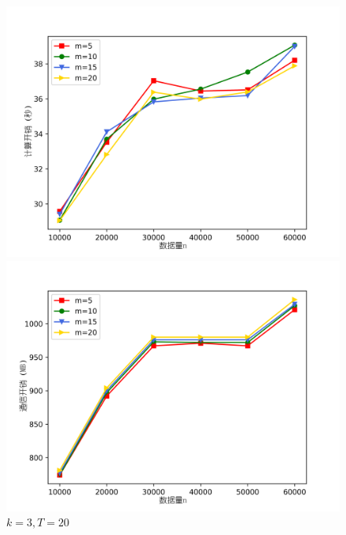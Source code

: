 \begin{figure}[htbp] %
	\begin{minipage}[t]{0.5\linewidth}
		\includegraphics[width=\linewidth]{img/m.png}
		
	\end{minipage}%
	\hfill%
	\begin{minipage}[t]{0.5\linewidth}
		\includegraphics[width=\linewidth]{img/m_comm.png}
		
	\end{minipage}
	\caption{$k=3, T=20$}
	\label{f6}
\end{figure}

